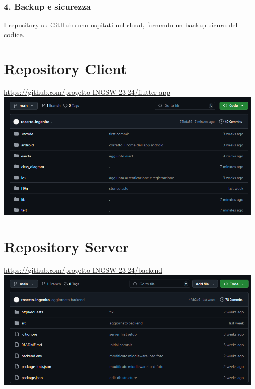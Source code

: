 \subsubsection*{4. Backup e sicurezza}
I repository su GitHub sono ospitati nel cloud, fornendo un backup sicuro del codice.

\section{Repository Client}
\url{https://github.com/progetto-INGSW-23-24/flutter-app}
\sskip
\includegraphics[width=\textwidth]{assets/versioning_screens/client.png}

\section{Repository Server}
\url{https://github.com/progetto-INGSW-23-24/backend}
\sskip
\includegraphics[width=\textwidth]{assets/versioning_screens/server.png}

